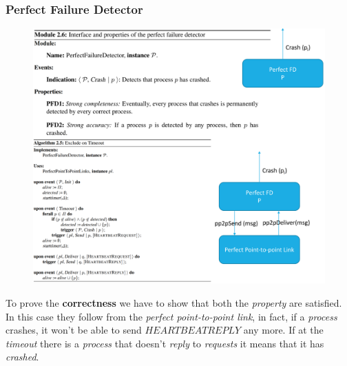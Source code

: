 \documentclass{article}
\begin{document}
\subsubsection{Perfect Failure Detector}
\begin{figure}[H]
  \centering
  \includegraphics[scale=0.5, left]{cattura19.png}
\end{figure}
To prove the \textbf{correctness} we have to show that both the \emph{property} are satisfied. In this case they follow from the \emph{perfect point-to-point link}, in fact, if a \emph{process} crashes, it won't be able to send $HEARTBEATREPLY$ any more. If at the \emph{timeout} there is a \emph{process} that doesn't \emph{reply} to \emph{requests} it means that it has \emph{crashed}. 
\end{document}
